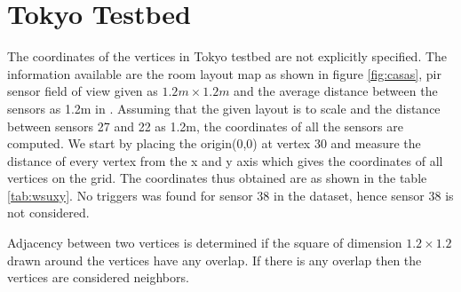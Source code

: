 \chapter{Tokyo Testbed}
\label{app:B}

The coordinates of the vertices in Tokyo testbed are not explicitly specified. The information available are the room layout map as shown in figure \ref{fig:casas}, pir sensor field of view given as $1.2m \times 1.2m$ and the average distance between the sensors as 1.2m in \cite{crandall2011tracking}. Assuming that the given layout is to scale and the distance between sensors 27 and 22 as 1.2m, the coordinates of all the sensors are computed. We start by placing the origin(0,0) at vertex 30 and measure the distance of every vertex from the x and y axis which gives the coordinates of all vertices on the grid. The coordinates thus obtained are as shown in the table \ref{tab:wsuxy}. No triggers was found for sensor 38 in the dataset, hence sensor 38 is not considered.

Adjacency between two vertices is determined if the square of dimension $1.2 \times 1.2$ drawn around the vertices have any overlap. If there is any overlap then the vertices are considered neighbors.


